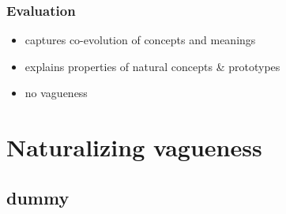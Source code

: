 \documentclass[fleqn,9pt,xcolor=dvipsnames]{beamer}
\newcommand{\mycol}[1]{{\color{mycol}{#1}}}
\begin{document}
\begin{frame}
  \frametitle{Evaluation}
    \vspace{0.3cm}

    \mycol{pro:}
    
    \begin{itemize}
    \item captures co-evolution of concepts and meanings
    \item explains properties of natural concepts \& prototypes\\
      \vspace{-0.13cm} \hspace{4cm}
      {\footnotesize{\color{gray}{(convexity)}}}
      \hspace{0.4cm} {\footnotesize{\color{gray}{(centrality)}}}
    \end{itemize}
 
    

    \vspace{0.3cm}
    
    \mycol{contra:}
    
    \begin{itemize}
    \item no vagueness
    \end{itemize}

    

\end{frame}




\section{Naturalizing vagueness}
\subsection{dummy}
\end{document}
